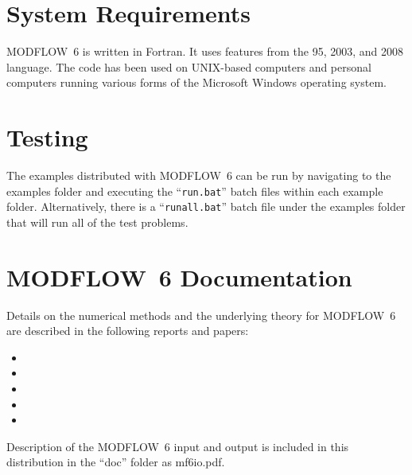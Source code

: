\documentclass[11pt,twoside,twocolumn]{usgsreport}
\begin{document}
\section{System Requirements}
MODFLOW~6 is written in Fortran.  It uses features from the 95, 2003, and 2008 language.  The code has been used on UNIX-based computers and personal computers running various forms of the Microsoft Windows operating system.

\section{Testing}
The examples distributed with MODFLOW~6 can be run by navigating to the examples folder and executing the ``\texttt{run.bat}'' batch files within each example folder.  Alternatively, there is a ``\texttt{runall.bat}'' batch file under the examples folder that will run all of the test problems.

\section{MODFLOW~6 Documentation}
Details on the numerical methods and the underlying theory for MODFLOW~6 are described in the following reports and papers:

\begin{itemize}

\item {}

\item {}

\item {}

\item {}

\item {}

\end{itemize}
 
\noindent Description of the MODFLOW~6 input and output is included in this distribution in the ``doc'' folder as mf6io.pdf.

\end{document}
